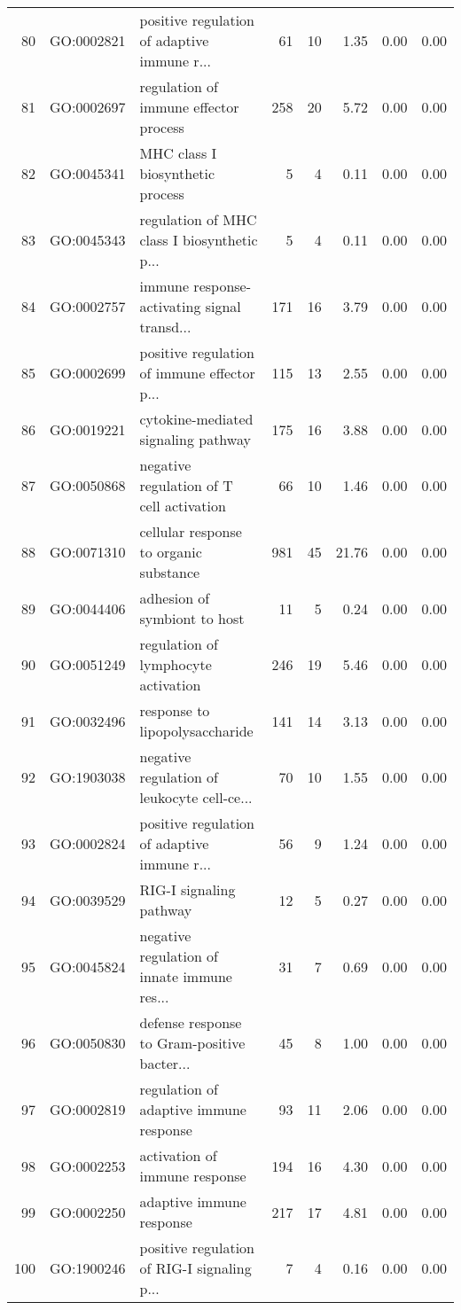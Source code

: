 \begin{table}[ht]
\begin{tabular}{rllrrrrr}
  80 & GO:0002821 & positive regulation of adaptive immune r... &  61 &  10 & 1.35 & 0.00 & 0.00 \\ 
  81 & GO:0002697 & regulation of immune effector process & 258 &  20 & 5.72 & 0.00 & 0.00 \\ 
  82 & GO:0045341 & MHC class I biosynthetic process &   5 &   4 & 0.11 & 0.00 & 0.00 \\ 
  83 & GO:0045343 & regulation of MHC class I biosynthetic p... &   5 &   4 & 0.11 & 0.00 & 0.00 \\ 
  84 & GO:0002757 & immune response-activating signal transd... & 171 &  16 & 3.79 & 0.00 & 0.00 \\ 
  85 & GO:0002699 & positive regulation of immune effector p... & 115 &  13 & 2.55 & 0.00 & 0.00 \\ 
  86 & GO:0019221 & cytokine-mediated signaling pathway & 175 &  16 & 3.88 & 0.00 & 0.00 \\ 
  87 & GO:0050868 & negative regulation of T cell activation &  66 &  10 & 1.46 & 0.00 & 0.00 \\ 
  88 & GO:0071310 & cellular response to organic substance & 981 &  45 & 21.76 & 0.00 & 0.00 \\ 
  89 & GO:0044406 & adhesion of symbiont to host &  11 &   5 & 0.24 & 0.00 & 0.00 \\ 
  90 & GO:0051249 & regulation of lymphocyte activation & 246 &  19 & 5.46 & 0.00 & 0.00 \\ 
  91 & GO:0032496 & response to lipopolysaccharide & 141 &  14 & 3.13 & 0.00 & 0.00 \\ 
  92 & GO:1903038 & negative regulation of leukocyte cell-ce... &  70 &  10 & 1.55 & 0.00 & 0.00 \\ 
  93 & GO:0002824 & positive regulation of adaptive immune r... &  56 &   9 & 1.24 & 0.00 & 0.00 \\ 
  94 & GO:0039529 & RIG-I signaling pathway &  12 &   5 & 0.27 & 0.00 & 0.00 \\ 
  95 & GO:0045824 & negative regulation of innate immune res... &  31 &   7 & 0.69 & 0.00 & 0.00 \\ 
  96 & GO:0050830 & defense response to Gram-positive bacter... &  45 &   8 & 1.00 & 0.00 & 0.00 \\ 
  97 & GO:0002819 & regulation of adaptive immune response &  93 &  11 & 2.06 & 0.00 & 0.00 \\ 
  98 & GO:0002253 & activation of immune response & 194 &  16 & 4.30 & 0.00 & 0.00 \\ 
  99 & GO:0002250 & adaptive immune response & 217 &  17 & 4.81 & 0.00 & 0.00 \\ 
  100 & GO:1900246 & positive regulation of RIG-I signaling p... &   7 &   4 & 0.16 & 0.00 & 0.00 \\ 
   \hline
\end{tabular}
\end{table}
